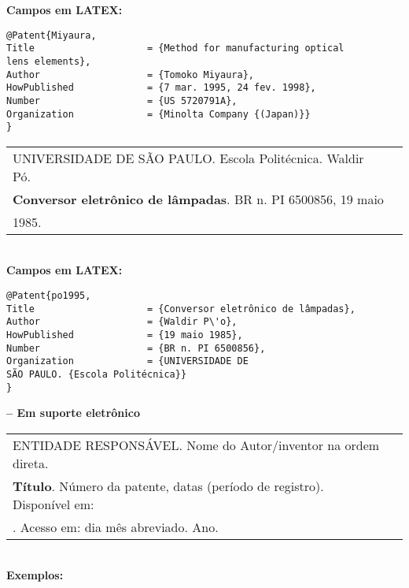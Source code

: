 \textbf{Campos em LATEX:} 
	
\begingroup
\fontsize{10pt}{12pt}\selectfont
\begin{verbatim}
@Patent{Miyaura,
Title                    = {Method for manufacturing optical 
lens elements},
Author                   = {Tomoko Miyaura},
HowPublished             = {7 mar. 1995, 24 fev. 1998},
Number                   = {US 5720791A},
Organization             = {Minolta Company {(Japan)}}
}
\end{verbatim}
\endgroup
	
\begin{tabular}{|l|c|} \hline
	UNIVERSIDADE DE SÃO PAULO. Escola Politécnica. Waldir Pó.           \\
	\textbf{Conversor eletrônico de lâmpadas}. BR n. PI 6500856, 19 maio \\1985. 
	                                                                       \\\hline
\end{tabular} \\
	
\textbf{Campos em LATEX:} 
	
\begingroup
\fontsize{10pt}{12pt}\selectfont
\begin{verbatim}
@Patent{po1995,
Title                    = {Conversor eletrônico de lâmpadas},
Author                   = {Waldir P\'o},
HowPublished             = {19 maio 1985},
Number                   = {BR n. PI 6500856},
Organization             = {UNIVERSIDADE DE 
SÃO PAULO. {Escola Politécnica}}
}
\end{verbatim}
\endgroup
	
\textbf{-- Em suporte eletrônico } \\
	
\begin{tabular}{|l|c|} \hline
	ENTIDADE RESPONSÁVEL. Nome do Autor/inventor na ordem direta. \\\textbf{Título}. Número da patente, datas (período de registro). Disponível em: \\<endereço eletrônico>. Acesso em: dia mês abreviado. Ano. 
	                                                               \\\hline
\end{tabular} \\
	
\textbf{Exemplos:} \\
	

